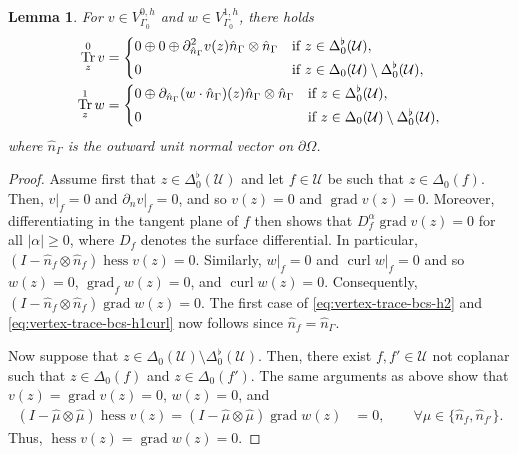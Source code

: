 \documentclass{mcom-l}
\newtheorem{lemma}[theorem]{Lemma}
\theoremstyle{definition}
\theoremstyle{remark}
\numberwithin{equation}{section}
\newcommand{\unitvec}[1]{\hat{#1}}
\DeclareMathOperator{\curl}{curl}
\DeclareMathOperator{\grad}{grad}
\DeclareMathOperator{\hess}{hess}
\DeclareMathOperator{\Tr}{Tr}
\newcommand{\boundarymesh}[0]{\mathcal{U}}
\begin{document}
\begin{lemma}
	\label{lem:vertex-trace-bcs}
	For $v \in V_{\Gamma_0}^{0, h}$ and $w \in V_{\Gamma_0}^{1, h}$, there holds 
	\begin{subequations}
		\label{eq:vertex-trace-bcs}
		\begin{align}
			\label{eq:vertex-trace-bcs-h2}
			\Tr_{z}^0 v &= \begin{dcases}
				0 \oplus 0 \oplus 
				\partial_{\unitvec{n}_{\Gamma}}^2 v(z) 
				\unitvec{n}_{\Gamma} \otimes \unitvec{n}_{\Gamma} 
				& \text{if } z \in \Delta_0^{\flat}(\boundarymesh), \\
				0 & \text{if } z \in \Delta_0(\boundarymesh) 
				\setminus \Delta_0^{\flat}(\boundarymesh),
			\end{dcases} \\
			\label{eq:vertex-trace-bcs-h1curl}
			\Tr_{z}^1 w &= \begin{dcases}
				0 \oplus \partial_{\unitvec{n}_{\Gamma}} 
				(w \cdot \unitvec{n}_{\Gamma})(z) 
				\unitvec{n}_{\Gamma} \otimes \unitvec{n}_{\Gamma}
				& \text{if } z \in \Delta_0^{\flat}(\boundarymesh), \\
				0 & \text{if } z \in \Delta_0(\boundarymesh) 
				\setminus \Delta_0^{\flat}(\boundarymesh),
			\end{dcases}
		\end{align}
	\end{subequations}
	where $\unitvec{n}_{\Gamma}$ is the outward unit normal vector on 
	$\partial \Omega$.
\end{lemma} 
\begin{proof}
	Assume first that $z \in \Delta_0^{\flat}(\boundarymesh)$ and let 
	$f \in \boundarymesh$ be such that $z \in \Delta_0(f)$.
	Then, $v|_f = 0$ and $\partial_n v|_f = 0$, and so $v(z) = 0$ 
	and $\grad v(z) = 0$. Moreover, differentiating in the tangent plane 
	of $f$ then shows that $D_f^{\alpha} \grad v(z) = 0$ for all 
	$|\alpha| \geq 0$, where $D_f$ denotes the surface differential.
	In particular, 
	$(I - \unitvec{n}_{f} \otimes \unitvec{n}_{f}) \hess v(z) = 0$. 
	Similarly, $w|_f = 0$ and $\curl w|_{f} = 0$ and so 
	$w(z) = 0$, $\grad_f w(z) = 0$, and $\curl w(z) = 0$. Consequently,
	$(I - \unitvec{n}_{f} \otimes \unitvec{n}_{f}) \grad w(z) = 0$.
	The first case of \cref{eq:vertex-trace-bcs-h2} and 
	\cref{eq:vertex-trace-bcs-h1curl} now follows since 
	$\unitvec{n}_f = \unitvec{n}_{\Gamma}$.
	
	Now suppose that $z \in \Delta_0(\boundarymesh) 
	\setminus \Delta_0^{\flat}(\boundarymesh)$. Then, there exist 
	$f, f' \in \boundarymesh$ not coplanar such that 
	$z \in \Delta_0(f)$ and $z \in \Delta_0(f')$. The same arguments 
	as above show that $v(z) = \grad v(z) = 0$, $w(z) = 0$, and 
	\begin{align*}
		(I - \unitvec{\mu} \otimes \unitvec{\mu}) \hess v(z) =
		(I - \unitvec{\mu} \otimes \unitvec{\mu}) \grad w(z)  &= 0,
		\qquad \forall \mu \in \{ \unitvec{n}_f, \unitvec{n}_{f'} \}. 		
	\end{align*}
	Thus, $\hess v(z) = \grad w(z) = 0$.
\end{proof}
\end{document}
